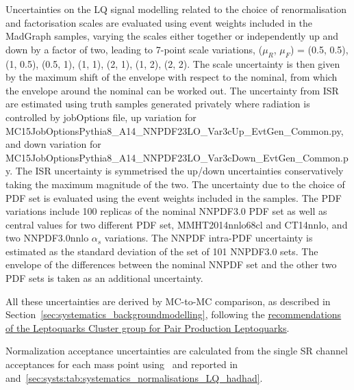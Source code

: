 Uncertainties on the LQ signal modelling related to the choice of renormalisation and factorisation scales are evaluated using event weights included in the 
MadGraph samples, varying the scales either together or independently up and down by a factor of two, leading to 7-point scale variations, ($\mu_R$, $\mu_F$) = 
(0.5, 0.5), (1, 0.5), (0.5, 1), (1, 1), (2, 1), (1, 2), (2, 2). The scale uncertainty is then given by the maximum shift of the envelope with respect to the nominal, from 
which the envelope around the nominal can be worked out.
The uncertainty from ISR are estimated using truth samples generated privately where radiation is controlled by jobOptions file, up variation for MC15JobOptions\/Pythia8\_A14\_NNPDF23LO\_Var3cUp\_EvtGen\_Common.py, and down variation for MC15JobOptions\/Pythia8\_A14\_NNPDF23LO\_Var3cDown\_EvtGen\_Common.py.
The ISR uncertainty is symmetrised the up/down uncertainties conservatively taking the maximum magnitude of the two.
The uncertainty due to the choice of PDF set is evaluated using the event weights included in the samples. The PDF variations include 100 replicas of the nominal NNPDF3.0 PDF set as well as central values for two different PDF set, MMHT2014nnlo68cl and CT14nnlo, and two NNPDF3.0nnlo $\alpha_s$ variations.  The NNPDF intra-PDF uncertainty is estimated as the standard deviation of the set of 101 NNPDF3.0 sets. The envelope of the differences between the nominal NNPDF set and the other two PDF sets is taken as an additional uncertainty. 

All these uncertainties are derived by MC-to-MC comparison, as described in Section~\ref{sec:systematics_backgroundmodelling}, following the \href{https://twiki.cern.ch/twiki/bin/viewauth/AtlasProtected/LeptoquarksCluster#Theory_uncertainties}{\underline{recommendations of the Leptoquarks Cluster group for Pair Production Leptoquarks}}. 

Normalization acceptance uncertainties are calculated from the single SR channel acceptances for each mass point using~ and reported in~ and~\ref{sec:systs:tab:systematics_normalisations_LQ_hadhad}.

